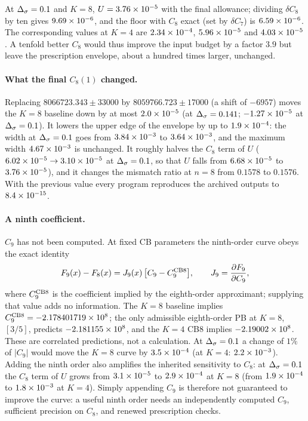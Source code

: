 At $\Delta_\sigma=0.1$ and $K=8$, $U=3.76\times10^{-5}$ with the final allowance; dividing $\delta C_8$ by ten
gives $9.69\times10^{-6}$, and the floor with $C_8$ exact (set by $\delta C_7$) is $6.59\times10^{-6}$.
The corresponding values at $K=4$ are $2.34\times10^{-4}$, $5.96\times10^{-5}$ and $4.03\times10^{-5}$. A
tenfold better $C_8$ would thus improve the input budget by a factor $3.9$ but leave the
prescription envelope, about a hundred times larger, unchanged.

\paragraph{What the final $C_8(1)$ changed.} Replacing $8066723.343\pm33000$ by
$8059766.723\pm17000$ (a shift of $-6957$) moves the $K=8$ baseline down by at most
$2.0\times10^{-5}$ (at $\Delta_\sigma=0.141$; $-1.27\times10^{-5}$ at $\Delta_\sigma=0.1$). It lowers the upper edge of
the envelope by up to $1.9\times10^{-4}$: the width at $\Delta_\sigma=0.1$ goes from $3.84\times10^{-3}$ to
$3.64\times10^{-3}$, and the maximum width $4.67\times10^{-3}$ is unchanged. It roughly halves the
$C_8$ term of $U$ ($6.02\times10^{-5}\to3.10\times10^{-5}$ at $\Delta_\sigma=0.1$, so that $U$ falls from
$6.68\times10^{-5}$ to $3.76\times10^{-5}$), and it changes the mismatch ratio at $n=8$ from $0.1578$
to $0.1576$. With the previous value every program reproduces the archived outputs to
$8.4\times10^{-15}$.

\paragraph{A ninth coefficient.} $C_9$ has not been computed. At fixed CB parameters the
ninth-order curve obeys the exact identity
\begin{equation}
 F_9(x)-F_8(x)=J_9(x)\,\bigl[C_9-C_9^{\rm CB8}\bigr],\qquad J_9=\frac{\partial F_9}{\partial C_9},
 \label{rs:eq:C9}
\end{equation}
where $C_9^{\rm CB8}$ is the coefficient implied by the eighth-order approximant; supplying
that value adds no information. The $K=8$ baseline implies
$C_9^{\rm CB8}=-2.178401719\times10^{8}$; the only admissible eighth-order PB at $K=8$, $[3/5]$,
predicts $-2.181155\times10^{8}$, and the $K=4$ CB8 implies $-2.19002\times10^{8}$. These are correlated
predictions, not a calculation. At $\Delta_\sigma=0.1$ a change of $1\%$ of $|C_9|$ would move the
$K=8$ curve by $3.5\times10^{-4}$ (at $K=4$: $2.2\times10^{-3}$). Adding the ninth order also amplifies
the inherited sensitivity to $C_8$: at $\Delta_\sigma=0.1$ the $C_8$ term of $U$ grows from $3.1\times10^{-5}$
to $2.9\times10^{-4}$ at $K=8$ (from $1.9\times10^{-4}$ to $1.8\times10^{-3}$ at $K=4$). Simply appending
$C_9$ is therefore not guaranteed to improve the curve: a useful ninth order needs an
independently computed $C_9$, sufficient precision on $C_8$, and renewed prescription checks.


